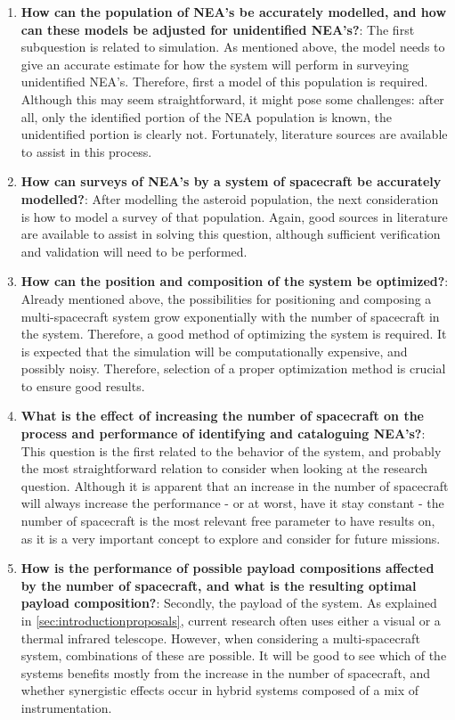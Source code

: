 \begin{enumerate}
 \item \textbf{How can the population of NEA's be accurately modelled, and how can these models be adjusted for unidentified NEA's?}: The first subquestion is related to simulation. As mentioned above, the model needs to give an accurate estimate for how the system will perform in surveying unidentified NEA's. Therefore, first a model of this population is required. Although this may seem straightforward, it might pose some challenges: after all, only the identified portion of the NEA population is known, the unidentified portion is clearly not. Fortunately, literature sources are available to assist in this process.
 \item \textbf{How can surveys of NEA's by a system of spacecraft be accurately modelled?}: After modelling the asteroid population, the next consideration is how to model a survey of that population. Again, good sources in literature are available to assist in solving this question, although sufficient verification and validation will need to be performed.
 \item \textbf{How can the position and composition of the system be optimized?}: Already mentioned above, the possibilities for positioning and composing a multi-spacecraft system grow exponentially with the number of spacecraft in the system. Therefore, a good method of optimizing the system is required. It is expected that the simulation will be computationally expensive, and possibly noisy. Therefore, selection of a proper optimization method is crucial to ensure good results.
 \item \textbf{What is the effect of increasing the number of spacecraft on the process and performance of identifying and cataloguing NEA's?}: This question is the first related to the behavior of the system, and probably the most straightforward relation to consider when looking at the research question. Although it is apparent that an increase in the number of spacecraft will always increase the performance - or at worst, have it stay constant - the number of spacecraft is the most relevant free parameter to have results on, as it is a very important concept to explore and consider for future missions.
 \item \textbf{How is the performance of possible payload compositions affected by the number of spacecraft, and what is the resulting optimal payload composition?}: Secondly, the payload of the system. As explained in \autoref{sec:introductionproposals}, current research often uses either a visual or a thermal infrared telescope. However, when considering a multi-spacecraft system, combinations of these are possible. It will be good to see which of the systems benefits mostly from the increase in the number of spacecraft, and whether synergistic effects occur in hybrid systems composed of a mix of instrumentation. 

\end{enumerate}
